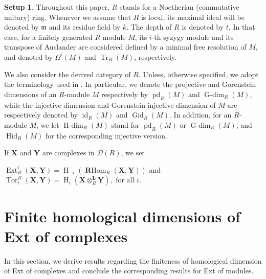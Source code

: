 \documentclass[11pt, a4paper,pagebackref]{amsart}
\numberwithin{equation}{section}
\theoremstyle{definition}
\newtheorem{remark and definition}[theorem]{Remark and Definition}
\newtheorem{remark and notation}[theorem]{Remark and Notation}
\newtheorem*{setup}{Setup}
\newcommand\Ext{\operatorname{Ext}}
\newcommand\Tor{\operatorname{Tor}}
\newcommand\RHom{\operatorname{\mathbf{R}Hom}}
\begin{document}
\begin{setup} Throughout this paper,  $R$ stands for a Noetherian (commutative unitary) ring. Whenever we assume that $R$ is local, its maximal ideal will be denoted by $\mathfrak{m}$ and its residue field by $k$. The depth of $R$ is denoted by $t$. In that case, for a finitely generated $R$-module $M$, its $i$-th syzygy module and its transpose of Auslander are considered defined by a minimal free resolution of $M$, and denoted by $\Omega^i(M)$ and  $\operatorname{Tr}_R(M)$, respectively. 

We also consider the derived category of $R$. Unless, otherwise specified, we adopt the terminology used in 
\cite{DerivedCategoryMethodsInCommutativeAlgebra}. In  particular, we denote the projective and Gorenstein dimensions of an $R$-module $M$ respectively by $\operatorname{pd}_R(M)$ and  $\operatorname{G-dim}_R(M)$, while the injective dimension and Gorenstein injective dimension of $M$ are respectively denoted by $\operatorname{id}_R(M)$ and $\operatorname{Gid}_R(M)$. In addition, for an $R$-module $M$, we let $\operatorname{H-dim}_R(M)$ stand for $\operatorname{pd}_R(M)$ or $\operatorname{G-dim}_R(M)$, and $\operatorname{Hid}_R(M)$ for the corresponding injective version.






If $\boldsymbol{X}$ and $\boldsymbol{Y}$ are complexes in $\mathcal{D}(R)$, we set 
\begin{center}
    $\Ext_R^i(\boldsymbol{X}, \boldsymbol{Y})=\operatorname{H}_{-i}(\RHom_R(\boldsymbol{X}, \boldsymbol{Y}))$ and $\Tor_i^R(\boldsymbol{X}, \boldsymbol{Y})=\operatorname{H}_i(\boldsymbol{X} \otimes_R^{\mathbf{L}} \boldsymbol{Y}), \text{ for all } i.$
\end{center}


\end{setup}


\section{Finite homological dimensions of Ext  of complexes}\label{sectionextofcomplexes}

In this section, we derive results regarding the finiteness of homological dimension of Ext of complexes and conclude the corresponding results for Ext of modules.
\end{document}
